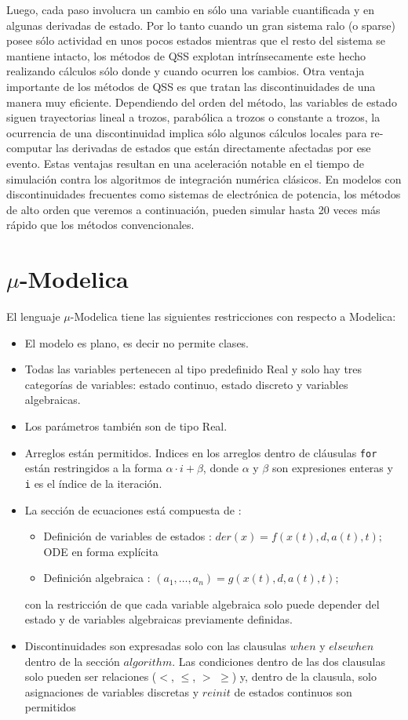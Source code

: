 	Luego, cada paso involucra un cambio en sólo una variable cuantificada y en algunas derivadas de estado. 
	Por lo tanto cuando un gran sistema ralo (o sparse) posee sólo actividad en unos pocos estados mientras que el resto del sistema se mantiene 
	intacto, los métodos de QSS explotan intrínsecamente este hecho realizando cálculos sólo donde y cuando ocurren los cambios.
	Otra ventaja importante de los métodos de QSS es que tratan las discontinuidades de una manera muy eficiente. Dependiendo del orden del método, 
	las variables de estado siguen trayectorias lineal a trozos, parabólica a trozos o constante a trozos, la ocurrencia de una discontinuidad implica 
	sólo algunos cálculos locales para re-computar las derivadas de estados que están directamente afectadas por ese evento.
	Estas ventajas resultan en una aceleración notable en el tiempo de simulación contra los algoritmos de integración numérica clásicos. 
	En modelos con discontinuidades frecuentes como sistemas de electrónica de potencia, los métodos de alto orden que veremos a continuación, 
	pueden simular hasta 20 veces más rápido que los métodos convencionales.


\section{$\mu$-Modelica}
	El lenguaje $\mu$-Modelica\cite{Ber12} tiene las siguientes restricciones con respecto a Modelica:

	\begin{itemize}
	 \item El modelo es plano, es decir no permite clases.
	 \item Todas las variables pertenecen al tipo predefinido Real y solo hay tres categorías de variables: estado continuo, estado discreto y variables 
	algebraicas.
	 \item Los parámetros también son de tipo Real. 
	 \item Arreglos están permitidos. Indices en los arreglos dentro de cláusulas \texttt{for} están restringidos a la forma $\alpha \cdot i + \beta$, 
	donde $\alpha$ y $\beta$ son expresiones enteras y \texttt{i} es el índice de la iteración.
	 \item La sección de ecuaciones está compuesta de :
	 \begin{itemize}
		\item Definición de variables de estados : $der(x) =  f (x(t), d, a(t), t);$ ODE en forma explícita
		\item Definición algebraica : $(a_1 , \dots , a_n ) = g(x(t), d, a(t), t);$
	 \end{itemize}
	 con la restricción de que cada variable algebraica solo puede depender del estado y de variables algebraicas previamente definidas.
	 
	 \item Discontinuidades son expresadas solo con las clausulas $when$ y $elsewhen$ dentro de la sección $algorithm$. Las condiciones dentro de las dos 
	clausulas solo pueden ser relaciones ($<$, $\leqslant$, $>$ $\geqslant$) y, dentro de la clausula, solo asignaciones de variables discretas y $reinit$ 
	de estados continuos son permitidos
	\end{itemize}

